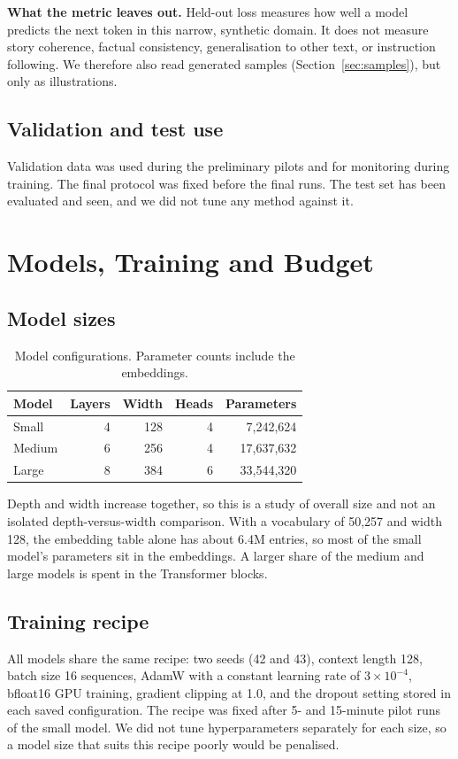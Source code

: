 \documentclass[11pt,a4paper]{article}
\begin{document}
\textbf{What the metric leaves out.} Held-out loss measures how well a model predicts the next token in this narrow, synthetic domain. It does not measure story coherence, factual consistency, generalisation to other text, or instruction following. We therefore also read generated samples (Section~\ref{sec:samples}), but only as illustrations.

\subsection{Validation and test use}
Validation data was used during the preliminary pilots and for monitoring during training. The final protocol was fixed before the final runs. The test set has been evaluated and seen, and we did not tune any method against it.

\section{Models, Training and Budget}
\subsection{Model sizes}
\label{sec:models}
\begin{table}[h]
\centering
\begin{tabular}{lrrrr}
\toprule
Model & Layers & Width & Heads & Parameters \\
\midrule
Small  & 4 & 128 & 4 & 7,242,624 \\
Medium & 6 & 256 & 4 & 17,637,632 \\
Large  & 8 & 384 & 6 & 33,544,320 \\
\bottomrule
\end{tabular}
\caption{Model configurations. Parameter counts include the embeddings.}
\label{tab:models}
\end{table}

Depth and width increase together, so this is a study of overall size and not an isolated depth-versus-width comparison. With a vocabulary of 50,257 and width 128, the embedding table alone has about 6.4M entries, so most of the small model's parameters sit in the embeddings. A larger share of the medium and large models is spent in the Transformer blocks.

\subsection{Training recipe}
All models share the same recipe: two seeds (42 and 43), context length 128, batch size 16 sequences, AdamW with a constant learning rate of $3\times10^{-4}$, bfloat16 GPU training, gradient clipping at 1.0, and the dropout setting stored in each saved configuration. The recipe was fixed after 5- and 15-minute pilot runs of the small model. We did not tune hyperparameters separately for each size, so a model size that suits this recipe poorly would be penalised.
\end{document}
